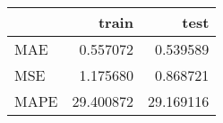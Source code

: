 \begin{tabular}{lrr}
\toprule
{} &      train &       test \\
\midrule
MAE  &   0.557072 &   0.539589 \\
MSE  &   1.175680 &   0.868721 \\
MAPE &  29.400872 &  29.169116 \\
\bottomrule
\end{tabular}

